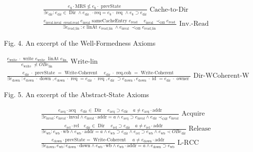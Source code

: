 \documentclass[10pt]{article}
\begin{document}
$$
\begin{gathered}
\frac{e_{\$} \cdot \mathrm{MRS} \not \leq e_{\$} \cdot \text { prevState }}{\exists e_{\mathrm{dir}}: e_{\mathrm{dir}} \in \operatorname{Dir} \wedge e_{\mathrm{dir} \cdot} \cdot \mathrm{req}=e_{\$} \cdot \text { req } \wedge e_{\$} \supset e_{\mathrm{dir}}} \text { Cache-to-Dir } \\
\frac{e_{\text {inval.inval } \text { eread.read }} e_{\mathrm{inval}} \text { sameCacheEntry } e_{\text {read }} \quad e_{\text {inval }} \prec_{\mathrm{OB}} e_{\text {read }}}{\exists e_{\text {read_lin }}: e \text { linAt } e_{\text {read_lin }} \wedge e_{\text {inval }} \prec_{\mathrm{OB}} e_{\text {read_lin }}} \text { Inv.-Read }
\end{gathered}
$$

Fig. 4. An excerpt of the Well-Formedness Axioms

$$
\begin{gathered}
\frac{e_{\text {write }} \cdot \text { write } e_{\text {write }} \text { linAt } e_{\text {lin }}}{e_{\text {write }} \nprec O B e_{\text {lin }}} \text { Write-lin } \\
\frac{e_{\text {dir }} \cdot \text { prevState }=\text { Write-Coherent } \quad e_{\text {dir }} \cdot \text { req.coh }=\text { Write-Coherent }}{\exists e_{\text {down }}: e_{\text {down }} \cdot \text { down }, e_{\text {down }} \cdot \text { req }=e_{\text {dir }} \cdot \text { req }, e_{\text {dir }} \supset e_{\text {down }}, e_{\text {down }} \cdot \text { id }=e_{\text {dir }} \cdot \text { owner }} \text { Dir-WCoherent-W }
\end{gathered}
$$

Fig. 5. An excerpt of the Abstract-State Axioms

$$
\begin{gathered}
\frac{e_{\mathrm{acq}} \cdot \mathrm{acq} \quad e_{\mathrm{dir}} \in \operatorname{Dir} \quad e_{\mathrm{acq}} \supset e_{\mathrm{dir}} \quad a \neq e_{\mathrm{acq}} \cdot \mathrm{addr}}{\exists e_{\mathrm{inval}}: e_{\mathrm{inval}} \cdot \mathrm{inval} \wedge e_{\mathrm{inval}} \cdot \mathrm{addr}=a \wedge e_{\mathrm{acq}} \supset e_{\mathrm{inval}} \wedge e_{\mathrm{dir}} \prec_{O B} e_{\mathrm{inval}}} \text { Acquire } \\
\frac{e_{\mathrm{rel}} \cdot \mathrm{rel} \quad e_{\mathrm{dir}} \in \operatorname{Dir} \quad e_{\mathrm{rel}} \supset e_{\mathrm{dir}} \quad a \neq e_{\mathrm{rel}} \cdot \mathrm{addr}}{\exists e_{\mathrm{wb}}: e_{\mathrm{wb}} \cdot \mathrm{wb} \wedge e_{\mathrm{wb}} \cdot \mathrm{addr}=a \wedge e_{\mathrm{wb}} \supset e_{\mathrm{dir}} \wedge e_{\mathrm{rel}} \supset e_{\mathrm{wb}} \wedge e_{\mathrm{wb}} \prec O B e_{\mathrm{dir}}} \text { Release } \\
\frac{e_{\mathrm{down}} \cdot \mathrm{prevState}=\text { Write-Coherent } \quad a \neq e_{\mathrm{down}} \cdot \mathrm{addr}}{\exists e_{\mathrm{down}}, e_{\mathrm{wb}}: e_{\mathrm{down}} \cdot \mathrm{down} \wedge e_{\mathrm{wb}} \cdot \mathrm{wb} \wedge e_{\mathrm{wb}} \cdot \mathrm{addr}=a \wedge e_{\mathrm{down}} \supset e_{\mathrm{wb}}} \text { L-RCC }
\end{gathered}
$$
\end{document}
